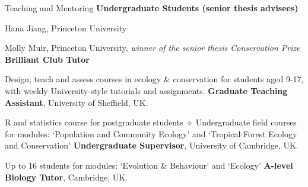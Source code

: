 \begin{rubric}{Teaching and Mentoring}
\entry*[2019 -- 2021] \textbf{Undergraduate Students (senior thesis advisees)}
\par Hana Jiang, Princeton University
\par Molly Muir, Princeton University, \emph{winner of the senior thesis Conservation Prize}
\entry*[2017 -- 2021] \textbf{Brilliant Club Tutor}
\par Design, teach and assess courses in ecology \& conservation for students aged 9-17, with weekly University-style tutorials and assignments.
\entry*[2014 -- 2018] \textbf{Graduate Teaching Assistant}, University of Sheffield, UK.
\par R and statistics course for postgraduate students $\diamond$ Undergraduate field courses for modules: `Population and Community Ecology' and `Tropical Forest Ecology and Conservation'
%
\entry*[2013 -- 2014] \textbf{Undergraduate Supervisor}, University of Cambridge, UK.
\par Up to 16 students for modules: `Evolution \& Behaviour' and  `Ecology'
\entry*[2013 -- 2014] \textbf{A-level Biology Tutor}, Cambridge, UK.

\end{rubric}